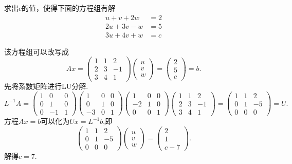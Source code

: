 ﻿\documentclass{book} \usepackage{exsheets} \usepackage{xeCJK}
\begin{document}
\begin{question}
  求出$c$的值，使得下面的方程组有解
  \begin{align*}
    u+v+2w&=2\\
    2u+3v-w&=5\\
    3u+4v+w&=c
  \end{align*}
\end{question}
\begin{solution}
  该方程组可以改写成
$$
Ax=\begin{pmatrix}
  1&1&2\\
  2&3&-1\\
  3&4&1
\end{pmatrix}
\begin{pmatrix}
  u\\
  v\\
  w
\end{pmatrix}=
\begin{pmatrix}
  2\\
  5\\
  c
\end{pmatrix}=b.
$$
先将系数矩阵进行LU分解.
$$
L^{-1}A=\begin{pmatrix}
  1&0&0\\
  0&1&0\\
  0&-1&1
\end{pmatrix}
\begin{pmatrix}
  1&0&0\\
  0&1&0\\
  -3&0&1
\end{pmatrix}
\begin{pmatrix}
  1&0&0\\
  -2&1&0\\
  0&0&1
\end{pmatrix}
\begin{pmatrix}
  1&1&2\\
  2&3&-1\\
  3&4&1
\end{pmatrix}=
\begin{pmatrix}
  1&1&2\\
  0&1&-5\\
  0&0&0
\end{pmatrix}=U.
$$
方程$Ax=b$可以化为$Ux=L^{-1}b$,即
$$
\begin{pmatrix}
  1&1&2\\
  0&1&-5\\
  0&0&0
\end{pmatrix}
\begin{pmatrix}
  u\\
  v\\
  w
\end{pmatrix}=
\begin{pmatrix}
  2\\
  1\\
  c-7
\end{pmatrix}.
$$
解得$c=7$.
\end{solution}
\end{document}
